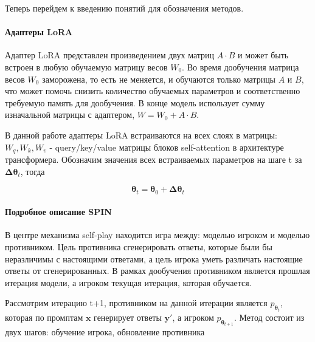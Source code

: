 \documentclass[12pt, twoside]{article}
\newcommand{\bx}{\mathbf{x}}
\newcommand{\by}{\mathbf{y}}
\newcommand{\btheta}{\boldsymbol{\theta}}
\newcommand{\bDelta}{\boldsymbol{\Delta}}
\begin{document}
Теперь перейдем к введению понятий для обозначения методов.

\paragraph{Адаптеры LoRA}
Адаптер LoRA представлен произведением двух матриц $A \cdot B$ и может быть встроен в любую обучаемую матрицу весов $W_0$. Во время дообучения матрица весов $W_0$ заморожена, то есть не меняется, и обучаются только матрицы $A$ и $B$, что может помочь снизить количество обучаемых параметров и соответственно требуемую память для дообучения. В конце модель использует сумму изначальной матрицы с адаптером, $W = W_0 + A \cdot B$.

В данной работе адаптеры LoRA встраиваются на всех слоях в матрицы: $W_q, W_k, W_v$ - query/key/value матрицы блоков self-attention в архитектуре трансформера. Обозначим значения всех встраиваемых параметров на шаге t за $\bDelta\btheta_t$, тогда

$$\btheta_t = \btheta_0 + \bDelta\btheta_t$$

\paragraph{Подробное описание SPIN}

В центре механизма self-play находится игра между: моделью игроком и моделью противником. Цель противника сгенерировать ответы, которые были бы неразличимы с настоящими ответами, а цель игрока уметь различать настоящие ответы от сгенерированных. В рамках дообучения противником является прошлая итерация модели, а игроком текущая итерация, которая обучается.

Рассмотрим итерацию t+1, противником на данной итерации является $p_{\btheta_t}$, которая по промптам $\bx$ генерирует ответы $\by'$, а игроком $p_{\btheta_{t+1}}$. Метод состоит из двух шагов: обучение игрока, обновление противника
\end{document}
